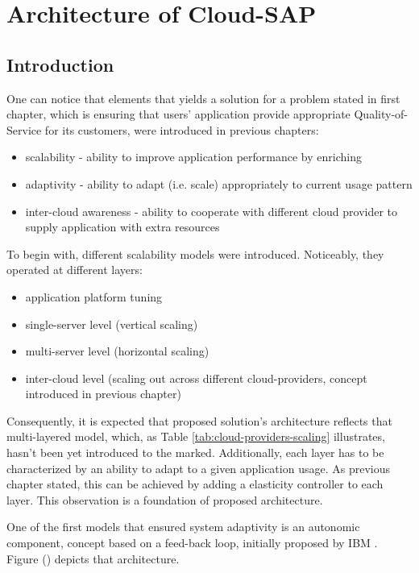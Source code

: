 \chapter{Architecture of Cloud-SAP}


\section{Introduction}

One can notice that elements that yields a solution for a problem stated in first chapter, which is ensuring that users' application provide appropriate Quality-of-Service for its customers, were introduced in previous chapters:
\begin{itemize}
	\item scalability - ability to improve application performance by enriching 
	\item adaptivity - ability to adapt (i.e. scale) appropriately to current usage pattern
	\item inter-cloud awareness - ability to cooperate with different cloud provider to supply application with extra resources
\end{itemize}

To begin with, different scalability models were introduced. Noticeably, they operated at different layers: 
\begin{itemize}
	\item application platform tuning
	\item single-server level (vertical scaling)
	\item multi-server level (horizontal scaling) 
	\item inter-cloud level (scaling out across different cloud-providers, concept introduced in previous chapter)
\end{itemize}
Consequently, it is expected that proposed solution's architecture reflects that multi-layered model, which, as Table \ref{tab:cloud-providers-scaling} illustrates, hasn't been yet introduced to the marked. Additionally, each layer has to be characterized by an ability to adapt to a given application usage. As previous chapter stated, this can be achieved by adding a elasticity controller to each layer. This observation is a foundation of proposed architecture.

One of the first models that ensured system adaptivity is an autonomic component, concept based on a feed-back loop, initially proposed by IBM \cite{IBM06}. Figure () depicts that architecture. 

